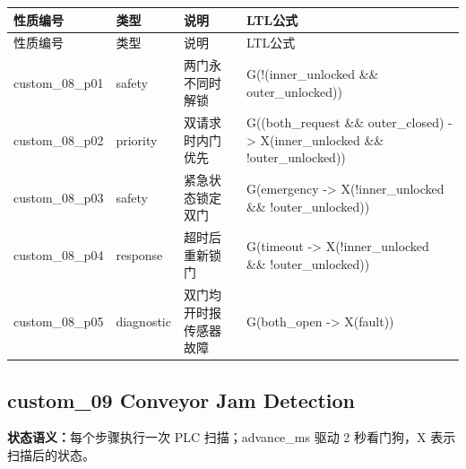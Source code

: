 \begin{longtable}{L{2.3cm}L{1.7cm}L{4.1cm}L{5.2cm}}

\toprule

性质编号 & 类型 & 说明 & LTL公式\\

\midrule

\endfirsthead

\toprule

性质编号 & 类型 & 说明 & LTL公式\\

\midrule

\endhead

{\ttfamily custom\_08\_p01} & safety & 两门永不同时解锁 & {\ttfamily G(!(inner\_unlocked \&\& outer\_unlocked))}\\

{\ttfamily custom\_08\_p02} & priority & 双请求时内门优先 & {\ttfamily G((both\_request \&\& outer\_closed) -> X(inner\_unlocked \&\& !outer\_unlocked))}\\

{\ttfamily custom\_08\_p03} & safety & 紧急状态锁定双门 & {\ttfamily G(emergency -> X(!inner\_unlocked \&\& !outer\_unlocked))}\\

{\ttfamily custom\_08\_p04} & response & 超时后重新锁门 & {\ttfamily G(timeout -> X(!inner\_unlocked \&\& !outer\_unlocked))}\\

{\ttfamily custom\_08\_p05} & diagnostic & 双门均开时报传感器故障 & {\ttfamily G(both\_open -> X(fault))}\\

\bottomrule

\end{longtable}

\subsection{{\ttfamily custom\_09} Conveyor Jam Detection}

\noindent\textbf{状态语义：}每个步骤执行一次 PLC 扫描；advance\_ms 驱动 2 秒看门狗，X 表示扫描后的状态。

